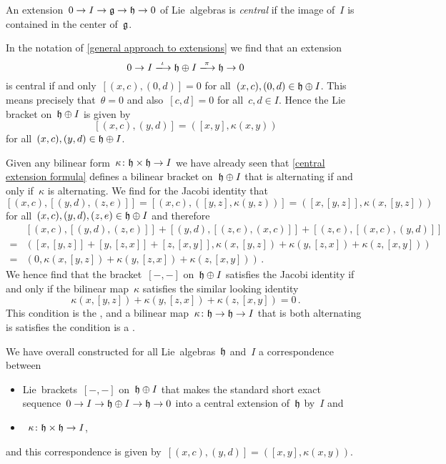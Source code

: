 \begin{definition}
  An extension~$0 \to I \to \mathfrak{g} \to \mathfrak{h} \to 0$ of Lie~algebras is \emph{central} if the image of~$I$ is contained in the center of~$\mathfrak{g}$.
\end{definition}


\begin{example}
  In the notation of \cref{general approach to extensions} we find that an extension
  \[
    0
    \to
    I
    \xlongto{\iota}
    \hlie \oplus I
    \xlongto{\pi}
    \hlie
    \to
    0
  \]
  is central if and only~$[(x,c), (0,d)] = 0$ for all~$(x,c), (0,d) \in \mathfrak{h} \oplus I$.
  This means precisely that~$\theta = 0$ and also~$[c,d] = 0$ for all~$c, d \in I$.
  Hence the Lie bracket on~$\mathfrak{h} \oplus I$ is given by
  \begin{equation}
    \label{central extension formula}
    [ (x,c), (y,d) ]
    =
    ( [x,y], \kappa(x,y) )
  \end{equation}
  for all~$(x,c), (y,d) \in \mathfrak{h} \oplus I$.
  
  Given any bilinear form~$\kappa \colon \mathfrak{h} \times \mathfrak{h} \to I$ we have already seen that \eqref{central extension formula} defines a bilinear bracket on~$\mathfrak{h} \oplus I$ that is alternating if and only if~$\kappa$ is alternating.
  We find for the Jacobi identity that
  \[
    [ (x,c), [ (y,d), (z,e) ] ]
    =
    [ (x,c), ([y,z], \kappa(y,z)) ]
    =
    ( [x,[y,z]], \kappa(x, [y,z]) )
  \]
  for all~$(x,c), (y,d), (z,e) \in \mathfrak{h} \oplus I$ and therefore
  \begin{align*}
    {}&
      [(x,c), [(y,d), (z,e)]]
    + [(y,d), [(z,e), (x,c)]]
    + [(z,e), [(x,c), (y,d)]]
    \\
    ={}&
    (
      [x,[y,z]] + [y,[z,x]] + [z,[x,y]],
      \kappa(x, [y,z]) + \kappa(y, [z,x]) + \kappa(z, [x,y])
    )
    \\
    ={}&
    ( 0, \kappa(x, [y,z]) + \kappa(y, [z,x]) + \kappa(z, [x,y]) ) \,.
  \end{align*}
  We hence find that the bracket~$[-,-]$ on~$\mathfrak{h} \oplus I$ satisfies the Jacobi identity if and only if the bilinear map~$\kappa$ satisfies the similar looking identity
  \[
    \kappa(x, [y,z]) + \kappa(y, [z,x]) + \kappa(z, [x,y])
    =
    0 \,.
  \]
  This condition is the , and a bilinear map~$\kappa \colon \mathfrak{h} \to \mathfrak{h} \to I$ that is both alternating is satisfies the {\twococycle} condition is a {\twococycle}.
  
  We have overall constructed for all Lie~algebras~$\mathfrak{h}$ and~$I$ a {\onetoone} correspondence between
  \begin{itemize}
    \item
      Lie~brackets~$[-,-]$ on~$\mathfrak{h} \oplus I$ that makes the standard short exact sequence~$0 \to I \to \mathfrak{h} \oplus I \to \mathfrak{h} \to 0$ into a central extension of~$\mathfrak{h}$ by~$I$ and
    \item
      {\twococycles}~$\kappa \colon \mathfrak{h} \times \mathfrak{h} \to I$,
  \end{itemize}
  and this correspondence is given by~$[(x,c), (y,d)] = ([x,y], \kappa(x,y))$.
\end{example}
